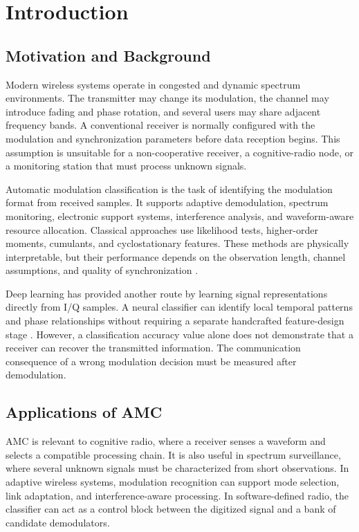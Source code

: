 \documentclass[12pt,twoside,openright]{report}
\begin{document}
\TableOfContents
\ListOfFigures
\ListOfTables

\StartBody
\pagestyle{fancy}
\fancyhf{}
\cfoot{\thepage}
\renewcommand{\headrulewidth}{0pt}
\renewcommand{\chaptermark}[1]{}
\renewcommand{\sectionmark}[1]{}

\chapter{Introduction}

\section{Motivation and Background}
Modern wireless systems operate in congested and dynamic spectrum
environments. The transmitter may change its modulation, the channel may
introduce fading and phase rotation, and several users may share adjacent
frequency bands. A conventional receiver is normally configured with the
modulation and synchronization parameters before data reception begins. This
assumption is unsuitable for a non-cooperative receiver, a cognitive-radio
node, or a monitoring station that must process unknown signals.

Automatic modulation classification is the task of identifying the
modulation format from received samples. It supports adaptive demodulation,
spectrum monitoring, electronic support systems, interference analysis, and
waveform-aware resource allocation. Classical approaches use likelihood
tests, higher-order moments, cumulants, and cyclostationary features. These
methods are physically interpretable, but their performance depends on the
observation length, channel assumptions, and quality of synchronization
\cite{haykin2005cognitive,azzouznandi1996,proakis2008digital}.

Deep learning has provided another route by learning signal representations
directly from I/Q samples. A neural classifier can identify local temporal
patterns and phase relationships without requiring a separate handcrafted
feature-design stage \cite{oshea2016convolutional,goodfellow2016dl}. However,
a classification accuracy value alone does not demonstrate that a receiver
can recover the transmitted information. The communication consequence of a
wrong modulation decision must be measured after demodulation.

\section{Applications of AMC}
AMC is relevant to cognitive radio, where a receiver senses a waveform and
selects a compatible processing chain. It is also useful in spectrum
surveillance, where several unknown signals must be characterized from short
observations. In adaptive wireless systems, modulation recognition can
support mode selection, link adaptation, and interference-aware processing.
In software-defined radio, the classifier can act as a control block between
the digitized signal and a bank of candidate demodulators.
\end{document}
